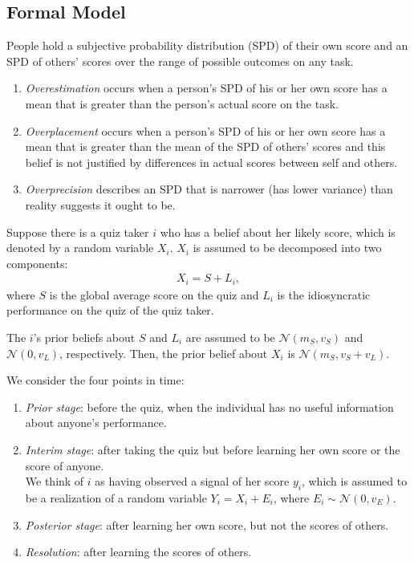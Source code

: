 \documentclass[11pt]{elegantbook}
\begin{document}
\subsection*{Formal Model}
People hold a subjective probability distribution (SPD) of their own score and an SPD of others' scores over the range of possible outcomes on any task.
\begin{enumerate}
    \item \textit{Overestimation} occurs when a person's SPD of his or her own score has a mean that is greater than the person's actual score on the task.
    \item \textit{Overplacement} occurs when a person's SPD of his or her own score has a mean that is greater than the mean of the SPD of others' scores and this belief is not justified by differences in actual scores between self and others.
    \item \textit{Overprecision}  describes an SPD that is narrower (has lower variance) than reality suggests it ought to be.
\end{enumerate}

Suppose there is a quiz taker $i$ who has a belief about her likely score, which is denoted by a random variable $X_i$. $X_i$ is assumed to be decomposed into two components:
\begin{equation}
    \begin{aligned}
        X_i=S+L_i,
    \end{aligned}
    \nonumber
\end{equation}
where $S$ is the global average score on the quiz and $L_i$ is the idiosyncratic performance on the quiz of the quiz taker.

The $i$'s prior beliefs about $S$ and $L_i$ are assumed to be $\mathcal{N}(m_S,v_S)$ and $\mathcal{N}(0,v_L)$, respectively. Then, the prior belief about $X_i$ is $\mathcal{N}(m_S,v_S+v_L)$.

We consider the four points in time:
\begin{enumerate}
    \item \textit{Prior stage}: before the quiz, when the individual has no useful information about anyone's performance.
    \item \textit{Interim stage}: after taking the quiz but before learning her own score or the score of anyone.\\
    We think of $i$ as having observed a signal of her score $y_i$, which is assumed to be a realization of a random variable $Y_i=X_i+E_i$, where $E_i\sim \mathcal{N}(0,v_E)$.
    \item \textit{Posterior stage}: after learning her own score, but not the scores of others.
    \item \textit{Resolution}: after learning the scores of others.
\end{enumerate}
\end{document}
